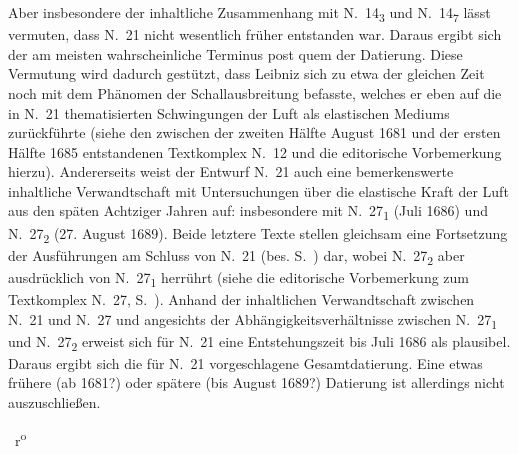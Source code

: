\begin{ledgroup}
Aber insbesondere der inhaltliche Zusammenhang mit N.~14\textsubscript{3} und N.~14\textsubscript{7} lässt vermuten, dass N.~21 nicht wesentlich früher entstanden war.
Daraus ergibt sich der am meisten wahrscheinliche Terminus post quem der Datierung.
Diese Vermutung wird dadurch gestützt, dass Leibniz sich zu etwa der gleichen Zeit noch mit dem Phänomen der Schallausbreitung befasste, welches er eben auf die in N.~21 thematisierten Schwingungen der Luft als elastischen Mediums zurückführte (siehe den zwischen der zweiten Hälfte August 1681 und der ersten Hälfte 1685 entstandenen Textkomplex N.~12 und die editorische Vorbemerkung hierzu).
\pend%
\pstart%
Andererseits weist der Entwurf N.~21 auch eine bemerkenswerte inhaltliche Verwandtschaft mit Untersuchungen über die elastische Kraft der Luft aus den späten Achtziger Jahren auf: insbesondere mit N.~27\textsubscript{1} (Juli 1686) und N.~27\textsubscript{2} (27. August 1689).
Beide letztere Texte stellen gleichsam eine Fortsetzung der Ausführungen am Schluss von N.~21 (bes. S.~) dar, wobei N.~27\textsubscript{2} aber ausdrücklich von N.~27\textsubscript{1} herrührt (siehe die editorische Vorbemerkung zum Textkomplex N.~27, S.~\pageref{LH_35_10_08_010-011+LH_35_10_08_015_Vorbemerkung}).
Anhand der inhaltlichen Verwandtschaft zwischen N.~21 und N.~27 und angesichts der Abhängigkeitsverhältnisse zwischen N.~27\textsubscript{1} und N.~27\textsubscript{2} erweist sich für N.~21 eine Entstehungszeit bis Juli 1686 als plausibel.
Daraus ergibt sich die für N.~21 vorgeschlagene Gesamtdatierung.
Eine etwas frühere (ab 1681?) oder spätere (bis August 1689?) Datierung ist allerdings nicht auszuschließen.

\pend
\end{ledgroup}
%
\newpage%
%
%
\count{}
\count{}
\count{}
%
%
\pstart%
\normalsize%
\noindent%
~r\textsuperscript{o}\rbrack\
\pend%
\pstart%
\centering%
